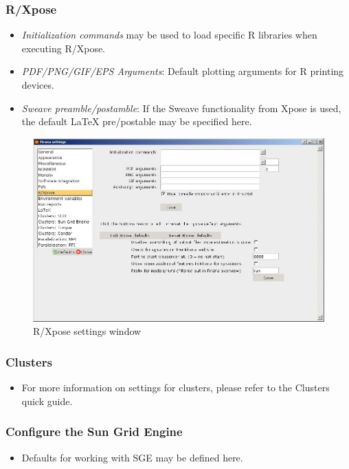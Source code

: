 \subsubsection*{R/Xpose}
\begin{itemize}
\item \emph{Initialization commands} may be used to load specific R libraries when executing R/Xpose. 
\item \emph{PDF/PNG/GIF/EPS Arguments}: Default plotting arguments for R printing devices.
\item \emph{Sweave preamble/postamble}: If the Sweave functionality from Xpose is used, the default LaTeX pre/postable may be specified here.
\end{itemize}

\begin{figure}[h] \centering
    \includegraphics[scale=.4]{images/settings_4.jpg}
    \caption{R/Xpose settings window}
\end{figure}

\subsubsection*{Clusters}
\begin{itemize}
\item For more information on settings for clusters, please refer to the Clusters quick guide.
\end{itemize}

\subsubsection*{Configure the Sun Grid Engine}
\begin{itemize}
\item Defaults for working with SGE may be defined here.
\end{itemize}

